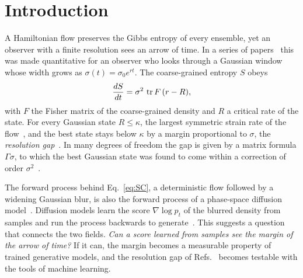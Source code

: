 \section{Introduction}
\label{sec:intro}

A Hamiltonian flow preserves the Gibbs entropy of every ensemble, yet an observer with a finite resolution sees an arrow of time. In a series of papers~\cite{namba2026arrow,namba2026gap,namba2026many} this was made quantitative for an observer who looks through a Gaussian window whose width grows as $\sigma(t) = \sigma_0 e^{rt}$. The coarse-grained entropy $S$ obeys
\begin{equation}
\frac{dS}{dt} = \sigma^2\,\operatorname{tr} F\,(r - R),
\label{eq:SC}
\end{equation}
with $F$ the Fisher matrix of the coarse-grained density and $R$ a critical rate of the state. For every Gaussian state $R \leq \kappa$, the largest symmetric strain rate of the flow~\cite{namba2026gap}, and the best state stays below $\kappa$ by a margin proportional to $\sigma$, the \emph{resolution gap}~\cite{namba2026gap}. In many degrees of freedom the gap is given by a matrix formula $\Gamma\sigma$, to which the best Gaussian state was found to come within a correction of order $\sigma^2$~\cite{namba2026many}.

The forward process behind Eq.~\eqref{eq:SC}, a deterministic flow followed by a widening Gaussian blur, is also the forward process of a phase-space diffusion model~\cite{dockhorn2022,namba2026threshold}. Diffusion models learn the score $\nabla\log p_t$ of the blurred density from samples and run the process backwards to generate~\cite{song2021,ho2020}. This suggests a question that connects the two fields. \emph{Can a score learned from samples see the margin of the arrow of time?} If it can, the margin becomes a measurable property of trained generative models, and the resolution gap of Refs.~\cite{namba2026gap,namba2026many} becomes testable with the tools of machine learning.

